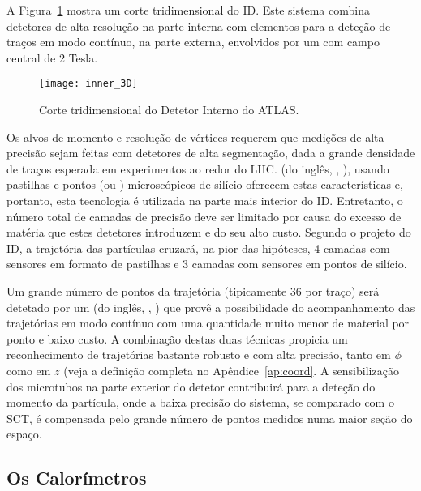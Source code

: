 A Figura~\ref{fig:atlas-id-3d} mostra um corte tridimensional do ID. Este
sistema combina detetores de alta resolução na parte interna com elementos
para a deteção de traços em modo contínuo, na parte externa, envolvidos por um
 com campo central de 2 Tesla.

\begin{figure}
\begin{center}
\texttt{[image: inner\_3D]}
\end{center}
\caption{Corte tridimensional do Detetor Interno do ATLAS.}
\label{fig:atlas-id-3d}
\end{figure}

Os alvos de momento e resolução de vértices requerem que medições de alta
precisão sejam feitas com detetores de alta segmentação, dada a grande
densidade de traços esperada em experimentos ao redor do LHC.  (do inglês, , ), usando pastilhas e
pontos (ou ) microscópicos de silício
oferecem estas características e, portanto, esta tecnologia é utilizada na
parte mais interior do ID. Entretanto, o número total de camadas de precisão
deve ser limitado por causa do excesso de matéria que estes detetores
introduzem e do seu alto custo. Segundo o projeto do ID, a trajetória das
partículas cruzará, na pior das hipóteses, 4 camadas com sensores em formato
de pastilhas e 3 camadas com sensores em pontos de silício.

Um grande número de pontos da trajetória (tipicamente 36 por traço) será
detetado por um  (do inglês,
, ) que provê a possibilidade do
acompanhamento das trajetórias em modo contínuo com uma quantidade muito menor
de material por ponto e baixo custo. A combinação destas duas técnicas
propicia um reconhecimento de trajetórias bastante robusto e com alta
precisão, tanto em $\phi$ como em $z$ (veja a definição completa no
Apêndice~\ref{ap:coord}. A sensibilização dos microtubos na parte
exterior do detetor contribuirá para a deteção do momento da partícula, onde a
baixa precisão do sistema, se comparado com o SCT, é compensada pelo grande
número de pontos medidos numa maior seção do espaço.

\subsection{Os Calorímetros}
\label{sec:atlas-calo}

